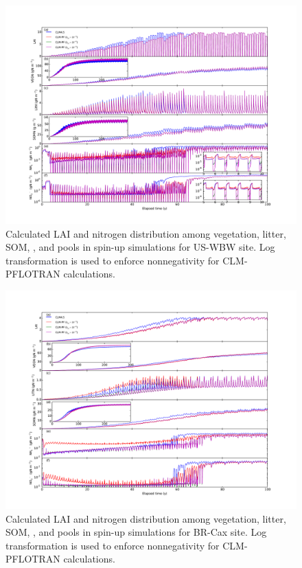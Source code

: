 \documentclass[gmd, manuscript]{copernicus}
\begin{document}
\begin{figure}[t]
\includegraphics[width=1.0\textwidth]{../figs/fig11/pit300yl.pdf}
\caption{Calculated LAI and nitrogen distribution among vegetation, litter,
SOM, , and  pools in spin-up simulations for US-WBW
site. Log transformation is used to enforce nonnegativity for CLM-PFLOTRAN
calculations.}
\label{fig:pit300yl}
\end{figure}

\begin{figure}[t]
\includegraphics[width=1.0\textwidth]{../figs/fig12/cax300yl.pdf}
\caption{Calculated LAI and nitrogen distribution among vegetation, litter,
SOM, , and  pools in spin-up simulations for BR-Cax
site. Log transformation is used to enforce nonnegativity for CLM-PFLOTRAN
calculations.}
\label{fig:cax300yl}
\end{figure}
\end{document}
